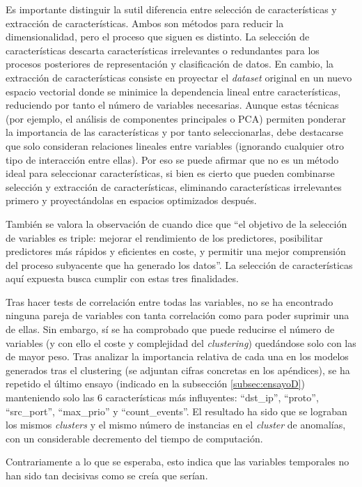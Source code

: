 Es importante distinguir la sutil diferencia entre selección de características y extracción de características.
Ambos son métodos para reducir la dimensionalidad, pero el proceso que siguen es distinto.
La selección de características descarta características irrelevantes o redundantes para los procesos posteriores de representación y clasificación de datos.
En cambio, la extracción de características consiste en proyectar el \emph{dataset} original en un nuevo espacio vectorial
donde se minimice la dependencia lineal entre características, reduciendo por tanto el número de variables necesarias.
Aunque estas técnicas (por ejemplo, el análisis de componentes principales o PCA) permiten ponderar la importancia de las características y por tanto seleccionarlas,
debe destacarse que solo consideran relaciones lineales entre variables (ignorando cualquier otro tipo de interacción entre ellas).
Por eso se puede afirmar que no es un método ideal para seleccionar características, si bien es cierto
que pueden combinarse selección y extracción de características, eliminando características irrelevantes primero y proyectándolas en espacios optimizados después.

También se valora la observación de \cite{Guyon_2003} cuando dice que ``el objetivo de la selección de variables es triple: mejorar el rendimiento de los predictores, posibilitar predictores más rápidos y eficientes en coste, y permitir una mejor comprensión del proceso subyacente que ha generado los datos''.
La selección de características aquí expuesta busca cumplir con estas tres finalidades.

Tras hacer tests de correlación entre todas las variables, no se ha encontrado ninguna pareja de variables con tanta correlación como para poder suprimir una de ellas.
Sin embargo, sí se ha comprobado que puede reducirse el número de variables (y con ello el coste y complejidad del \emph{clustering}) quedándose solo con las de mayor peso.
Tras analizar la importancia relativa de cada una en los modelos generados tras el clustering (se adjuntan cifras concretas en los apéndices),
se ha repetido el último ensayo (indicado en la subsección \ref{subsec:ensayoD}) manteniendo solo las 6 características más influyentes: ``dst\_ip'', ``proto'', ``src\_port'', ``max\_prio'' y ``count\_events''.
El resultado ha sido que se lograban los mismos \emph{clusters} y el mismo número de instancias en el \emph{cluster} de anomalías, con un considerable decremento del tiempo de computación.

Contrariamente a lo que se esperaba, esto indica que las variables temporales no han sido tan decisivas como se creía que serían.

